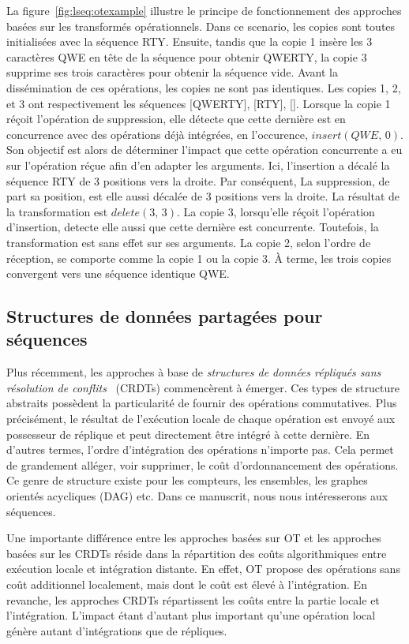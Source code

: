 La figure~\ref{fig:lseq:otexample} illustre le principe de fonctionnement des
approches basées sur les transformés opérationnels. Dans ce scenario, les copies
sont toutes initialisées avec la séquence RTY. Ensuite, tandis que la copie 1
insère les 3 caractères QWE en tête de la séquence pour obtenir QWERTY, la copie
3 supprime ses trois caractères pour obtenir la séquence vide. Avant la
dissémination de ces opérations, les copies ne sont pas identiques. Les copies
1, 2, et 3 ont respectivement les séquences [QWERTY], [RTY], []. Lorsque la
copie 1 réçoit l'opération de suppression, elle détecte que cette dernière est
en concurrence avec des opérations déjà intégrées, en l'occurence,
$insert(QWE,\,0)$. Son objectif est alors de déterminer l'impact que cette
opération concurrente a eu sur l'opération réçue afin d'en adapter les
arguments. Ici, l'insertion a décalé la séquence RTY de 3 positions vers la
droite. Par conséquent, La suppression, de part sa position, est elle aussi
décalée de 3 positions vers la droite. La résultat de la transformation est
$delete(3,\,3)$.  La copie 3, lorsqu'elle réçoit l'opération d'insertion,
detecte elle aussi que cette dernière est concurrente. Toutefois, la
transformation est sans effet sur ses arguments. La copie 2, selon l'ordre de
réception, se comporte comme la copie 1 ou la copie 3. À terme, les trois copies
convergent vers une séquence identique QWE.

\subsection{Structures de données partagées pour séquences}

Plus récemment, les approches à base de \emph{structures de données répliqués
  sans résolution de conflits}~\cite{shapiro2011comprehensive,
  shapiro2011conflict} (CRDTs) commencèrent à émerger. Ces types de structure
abstraits possèdent la particularité de fournir des opérations commutatives.
Plus précisément, le résultat de l'exécution locale de chaque opération est
envoyé aux possesseur de réplique et peut directement être intégré à cette
dernière.  En d'autres termes, l'ordre d'intégration des opérations n'importe
pas. Cela permet de grandement alléger, voir supprimer, le coût d'ordonnancement
des opérations. Ce genre de structure existe pour les compteurs, les ensembles,
les graphes orientés acycliques (DAG) etc. Dans ce manuscrit, nous nous
intéresserons aux séquences.

Une importante différence entre les approches basées sur OT et les approches
basées sur les CRDTs réside dans la répartition des coûts algorithmiques entre
exécution locale et intégration distante. En effet, OT propose des opérations
sans coût additionnel localement, mais dont le coût est élevé à l'intégration.
En revanche, les approches CRDTs répartissent les coûts entre la partie locale
et l'intégration.  L'impact étant d'autant plus important qu'une opération local
génère autant d'intégrations que de répliques.

